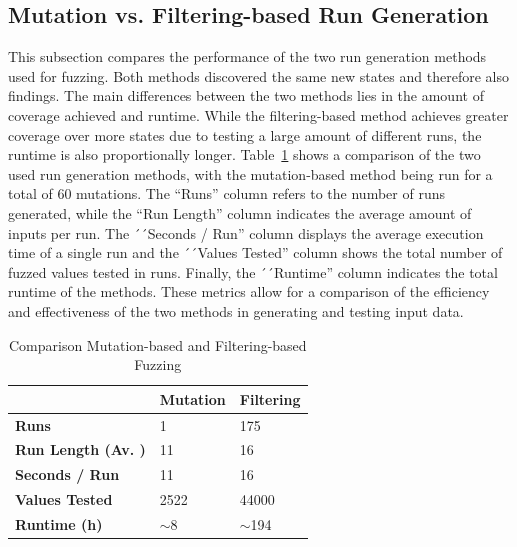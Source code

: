 \subsection{Mutation vs. Filtering-based Run Generation} \label{subsec:mutation_vs_filtering}
This subsection compares the performance of the two run generation methods used for fuzzing. Both methods discovered the same new states and therefore also findings. The main differences between the two methods lies in the amount of coverage achieved and runtime. While the filtering-based method achieves greater coverage over more states due to testing a large amount of different runs, the runtime is also proportionally longer. Table~\ref{tab:compfuzz} shows a comparison of the two used run generation methods, with the mutation-based method being run for a total of 60 mutations. The ``Runs'' column refers to the number of runs generated, while the ``Run Length'' column indicates the average amount of inputs per run. The ´´Seconds / Run'' column displays the average execution time of a single run and the ´´Values Tested'' column shows the total number of fuzzed values tested in runs. Finally, the ´´Runtime'' column indicates the total runtime of the methods. These metrics allow for a comparison of the efficiency and effectiveness of the two methods in generating and testing input data.

\begin{table}[]
	\centering
	\begin{tabular}{|l|l|l|}
		\hline
		\rowcolor[HTML]{EFEFEF} 
		& \textbf{Mutation} & \textbf{Filtering} \\ \hline
		\textbf{Runs}              & 1                 & 175                \\ \hline
		\textbf{Run Length (Av. )} & 11                & 16                 \\ \hline
		\textbf{Seconds / Run}     & 11                & 16                 \\ \hline
		\textbf{Values Tested}     & 2522              & 44000              \\ \hline
		\textbf{Runtime (h)}       & $\sim$8           & $\sim$194          \\ \hline
	\end{tabular}
	\caption{Comparison Mutation-based and Filtering-based Fuzzing}
	\label{tab:compfuzz}
\end{table}

